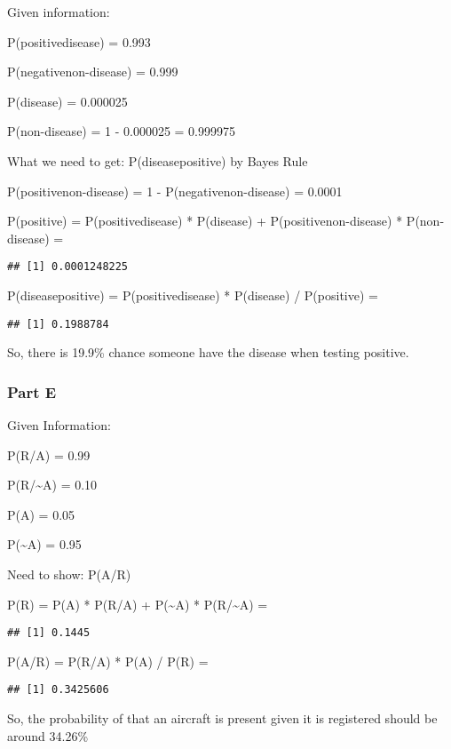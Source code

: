 \documentclass[
]{article}
\begin{document}
Given information:

P(positive\textbar disease) = 0.993

P(negative\textbar non-disease) = 0.999

P(disease) = 0.000025

P(non-disease) = 1 - 0.000025 = 0.999975

What we need to get: P(disease\textbar positive) by Bayes Rule

P(positive\textbar non-disease) = 1 - P(negative\textbar non-disease) = 0.0001

P(positive) = P(positive\textbar disease) * P(disease) + P(positive\textbar non-disease) * P(non-disease) =

\begin{verbatim}
## [1] 0.0001248225
\end{verbatim}

P(disease\textbar positive) = P(positive\textbar disease) * P(disease) / P(positive) =

\begin{verbatim}
## [1] 0.1988784
\end{verbatim}

So, there is 19.9\% chance someone have the disease when testing positive.

\hypertarget{part-e}{%
\subsubsection{Part E}\label{part-e}}

Given Information:

P(R/A) = 0.99

P(R/\textasciitilde A) = 0.10

P(A) = 0.05

P(\textasciitilde A) = 0.95

Need to show: P(A/R)

P(R) = P(A) * P(R/A) + P(\textasciitilde A) * P(R/\textasciitilde A) =

\begin{verbatim}
## [1] 0.1445
\end{verbatim}

P(A/R) = P(R/A) * P(A) / P(R) =

\begin{verbatim}
## [1] 0.3425606
\end{verbatim}

So, the probability of that an aircraft is present given it is registered should be around 34.26\%
\end{document}
